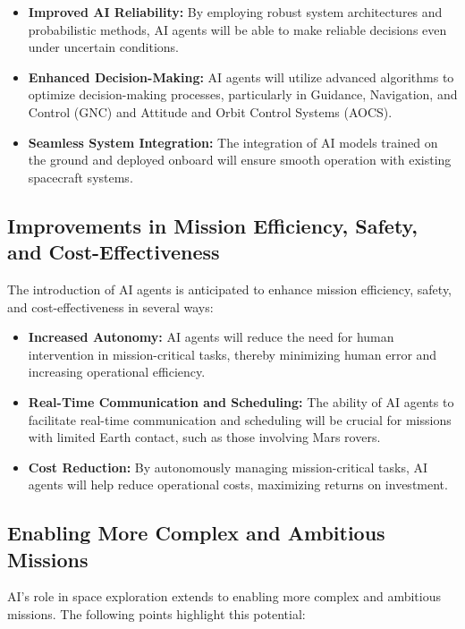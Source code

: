 \documentclass[a4paper, 11pt]{article}
\begin{document}
\begin{itemize}
    \item \textbf{Improved AI Reliability:} By employing robust system architectures and probabilistic methods, AI agents will be able to make reliable decisions even under uncertain conditions.
    \item \textbf{Enhanced Decision-Making:} AI agents will utilize advanced algorithms to optimize decision-making processes, particularly in Guidance, Navigation, and Control (GNC) and Attitude and Orbit Control Systems (AOCS).
    \item \textbf{Seamless System Integration:} The integration of AI models trained on the ground and deployed onboard will ensure smooth operation with existing spacecraft systems.
\end{itemize}

\subsection{Improvements in Mission Efficiency, Safety, and Cost-Effectiveness}

The introduction of AI agents is anticipated to enhance mission efficiency, safety, and cost-effectiveness in several ways:

\begin{itemize}
    \item \textbf{Increased Autonomy:} AI agents will reduce the need for human intervention in mission-critical tasks, thereby minimizing human error and increasing operational efficiency.
    \item \textbf{Real-Time Communication and Scheduling:} The ability of AI agents to facilitate real-time communication and scheduling will be crucial for missions with limited Earth contact, such as those involving Mars rovers.
    \item \textbf{Cost Reduction:} By autonomously managing mission-critical tasks, AI agents will help reduce operational costs, maximizing returns on investment.
\end{itemize}

\subsection{Enabling More Complex and Ambitious Missions}

AI's role in space exploration extends to enabling more complex and ambitious missions. The following points highlight this potential:
\end{document}
